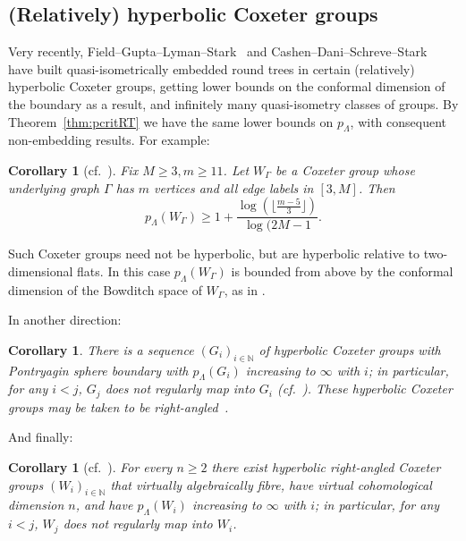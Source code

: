 \documentclass[11pt]{amsart}
\numberwithin{equation}{section}
\newtheorem{corollary}[equation]{Corollary}
\theoremstyle{citing}
\newcommand{\N}{\mathbb{N}}
\numberwithin{equation}{section}
\begin{document}
\subsection{(Relatively) hyperbolic Coxeter groups}
\label{ssec:coxeter-application}

Very recently, Field--Gupta--Lyman--Stark~\cite{Field-Gupta-Lyman-Stark-25-coxeter-confdim} and Cashen--Dani--Schreve--Stark~\cite{Cashen-Dani-Schreve-Stark-25-RACG-confdim} have built quasi-isometrically embedded round trees in certain (relatively) hyperbolic Coxeter groups, getting lower bounds on the conformal dimension of the boundary as a result, and infinitely many quasi-isometry classes of groups. 
By Theorem~\ref{thm:pcritRT} we have the same lower bounds on $p_\Lambda$, with consequent non-embedding results.  For example:

\begin{corollary}
	[{cf.\ \cite[Theorem A]{Field-Gupta-Lyman-Stark-25-coxeter-confdim}}]
	Fix $M \geq 3, m \geq 11$.  Let $W_\Gamma$ be a Coxeter group whose underlying graph $\Gamma$ has $m$ vertices and all edge labels in $[3,M]$.  Then
	\[
		p_\Lambda(W_\Gamma) \geq 1+ \frac{\log(\lfloor \frac{m-5}{3}\rfloor)}{\log(2M-1}.
	\]
\end{corollary}
Such Coxeter groups need not be hyperbolic, but are hyperbolic relative to two-dimensional flats.  In this case $p_\Lambda(W_\Gamma)$ is bounded from above by the conformal dimension of the Bowditch space of $W_\Gamma$, as in \cite[Theorem B]{Field-Gupta-Lyman-Stark-25-coxeter-confdim}.

In another direction:
\begin{corollary}
	There is a sequence $(G_i)_{i \in \N}$ of hyperbolic Coxeter groups with Pontryagin sphere boundary with $p_\Lambda(G_i)$ increasing to $\infty$ with $i$; in particular, for any $i<j$, $G_j$ does not regularly map into $G_i$
	(cf.\ \cite[Theorem D]{Field-Gupta-Lyman-Stark-25-coxeter-confdim}).
	These hyperbolic Coxeter groups may be taken to be right-angled~\cite[Theorem 5.1]{Cashen-Dani-Schreve-Stark-25-RACG-confdim}.	
\end{corollary}

And finally:
\begin{corollary}
	[{cf.\ \cite[Theorem 3.1]{Cashen-Dani-Schreve-Stark-25-RACG-confdim}}]
	For every $n\geq 2$ there exist hyperbolic right-angled Coxeter groups $(W_i)_{i\in \N}$ that virtually algebraically fibre, have virtual cohomological dimension $n$, and have $p_\Lambda(W_i)$ increasing to $\infty$ with $i$; in particular, for any $i<j$, $W_j$ does not regularly map into $W_i$.
\end{corollary}
\end{document}
